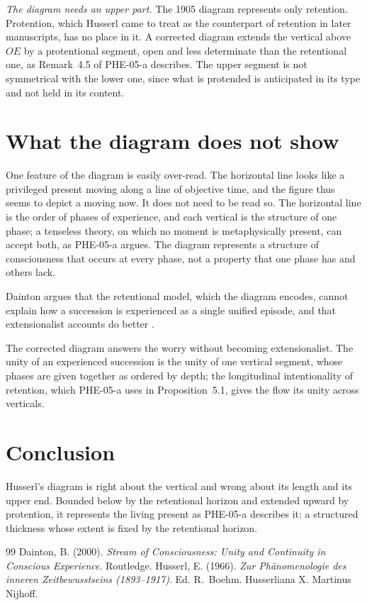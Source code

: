 \documentclass{situationist-preprint}
\begin{document}
\emph{The diagram needs an upper part.} The 1905 diagram represents only retention. Protention, which Husserl came to treat as the counterpart of retention in later manuscripts, has no place in it. A corrected diagram extends the vertical above $OE$ by a protentional segment, open and less determinate than the retentional one, as Remark~4.5 of PHE-05-a describes. The upper segment is not symmetrical with the lower one, since what is protended is anticipated in its type and not held in its content.

\section{What the diagram does not show}

One feature of the diagram is easily over-read. The horizontal line looks like a privileged present moving along a line of objective time, and the figure thus seems to depict a moving now. It does not need to be read so. The horizontal line is the order of phases of experience, and each vertical is the structure of one phase; a tenseless theory, on which no moment is metaphysically present, can accept both, as PHE-05-a argues. The diagram represents a structure of consciousness that occurs at every phase, not a property that one phase has and others lack.

\begin{objection}
Dainton argues that the retentional model, which the diagram encodes, cannot explain how a succession is experienced as a single unified episode, and that extensionalist accounts do better \citep{Dainton2000}.
\end{objection}

\begin{reply}
The corrected diagram answers the worry without becoming extensionalist. The unity of an experienced succession is the unity of one vertical segment, whose phases are given together as ordered by depth; the longitudinal intentionality of retention, which PHE-05-a uses in Proposition~5.1, gives the flow its unity across verticals.
\end{reply}

\section{Conclusion}

Husserl's diagram is right about the vertical and wrong about its length and its upper end. Bounded below by the retentional horizon and extended upward by protention, it represents the living present as PHE-05-a describes it: a structured thickness whose extent is fixed by the retentional horizon.

\begin{thebibliography}{99}\small
{} Dainton, B. (2000). \emph{Stream of Consciousness: Unity and Continuity in Conscious Experience}. Routledge.
 Husserl, E. (1966). \emph{Zur Phänomenologie des inneren Zeitbewusstseins (1893--1917)}. Ed. R.~Boehm. Husserliana X. Martinus Nijhoff.
\end{thebibliography}
\end{document}
